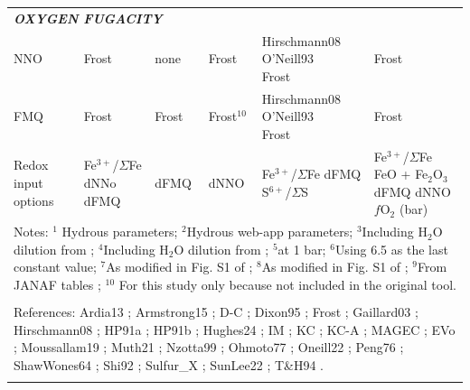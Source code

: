 \begin{landscape}
\begin{longtable}{p{1.4cm}p{3cm}p{3cm}p{3cm}p{3cm}p{3cm}}
\multicolumn{6}{p{17.8cm}}{\cellcolor[HTML]{D9D9D9}\textit{\textbf{OXYGEN FUGACITY}}} \\
NNO &
  Frost &
  none &
  Frost &
  \makecell[lt]{Hirschmann08\\O'Neill93\\Frost} &
  Frost \\
FMQ &
  Frost &
  Frost &
  Frost$^{10}$ &
  \makecell[lt]{Hirschmann08\\O'Neill93\\Frost}  &
  Frost \\
Redox input options &
  \makecell[lt]{Fe$^{3+}$/$\Sigma$Fe\\dNNo\\dFMQ} &
  dFMQ &
  dNNO &
  \makecell[lt]{Fe$^{3+}$/$\Sigma$Fe\\dFMQ\\S$^{6+}$/$\Sigma$S} &
  \makecell[lt]{Fe$^{3+}$/$\Sigma$Fe\\FeO + Fe$_2$O$_3$\\dFMQ\\dNNO\\$f$O$_2$ (bar)} \\
\hline
\multicolumn{6}{p{17.8cm}}{\footnotesize Notes: $^1$ Hydrous parameters; $^2$Hydrous web-app parameters; $^3$Including H$_2$O dilution from \cite{o2021thermodynamic}; $^4$Including H$_2$O dilution from \cite{o2002sulfide}; $^5$at 1 bar; $^6$Using 6.5 as the last constant value; $^7$As modified in Fig. S1 of \cite{Hughes2023}; $^8$As modified in Fig. S1 of \cite{hughes2024}; $^9$From JANAF tables \citep{janaf1998}; $^{10}$ For this study only because not included in the original tool.} \\
\multicolumn{6}{p{17.8cm}}{} \\
\multicolumn{6}{p{17.8cm}}{\footnotesize References: Ardia13 \citep[Eq. 7a][]{ardia2013}; Armstrong15 \citep[Eq. 10][]{armstrong}; D-C \citep[D-Compress][]{Burgisser2015}; Dixon95 \citep[Bullet 5 from][]{dixon1995}; Frost \citep{Frost1991}; Gaillard03 \citep[Section 5.4][]{Gaillard2003}; Hirschmann08 \citep[Table 7][]{hirschmann2008-LEPR}; HP91a \citep[Eq. A2--A3][]{holland1991}; HP91b \citep[Eq. 4, 6, A1--3; Table 1][]{holland1991}; Hughes24 \citep{hughes2024}; IM \citep{IaconoMarziano2012}; KC \citep[Eq. 7][]{Kress1991}; KC-A \citep[Eq. A-5, A-6][]{Kress1991}; MAGEC \citep{Sun2024}; EVo \citep{Liggins2022}; Moussallam19 \citep[Eq. 8][]{moussallam2019}; Muth21 \citep{Muth2021}; Nzotta99 \citep[Eq. 3][]{nzotta1999}; Ohmoto77 \citep[Table 1][]{ohmoto1977}; Oneill22 \citep[Eq. 13][]{o2002sulfide}; Peng76 \citep[Eq. 15][]{peng1976}; ShawWones64 \citep[Eq. 4][]{shaw1964}; Shi92 \citep{shi1992}; Sulfur\_X \citep{Ding2023}; SunLee22 \citep{Sun2022}; T\&H94 \cite{thibault1994solubility}.} \\

\label{table:table_comparison-table}

\end{longtable}
\end{landscape}
